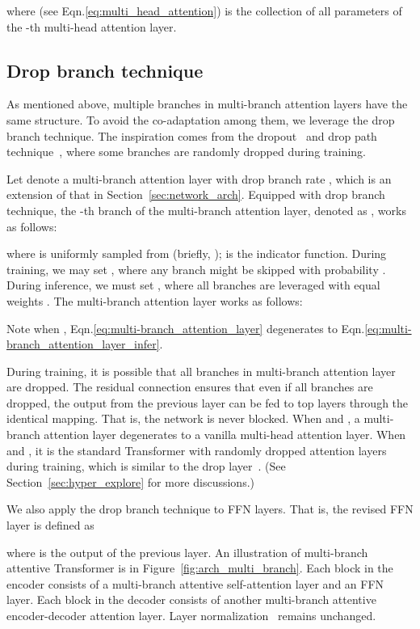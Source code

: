 \documentclass{article}
\begin{document}
where  (see Eqn.\eqref{eq:multi_head_attention}) is the collection of all parameters of the -th multi-head attention layer. 

\subsection{Drop branch technique}\label{sec:drop_branch}
As mentioned above, multiple branches in multi-branch attention layers have the same structure. To avoid the co-adaptation among them, we leverage the drop branch technique. The inspiration comes from the dropout~\cite{srivastava2014dropout} and drop path technique~\cite{larsson2017fractalnet}, where some branches are randomly dropped during training.

Let  denote a multi-branch attention layer with drop branch rate , which is an extension of that in Section~\ref{sec:network_arch}. Equipped with drop branch technique, the -th branch of the multi-branch attention layer, denoted as , works as follows:

where  is uniformly sampled from  (briefly, );  is the indicator function.
During training, we may set , where any branch might be skipped with probability . During inference, we must set , where all branches are leveraged with equal weights . The multi-branch attention layer  works as follows:

Note when , Eqn.\eqref{eq:multi-branch_attention_layer} degenerates to Eqn.\eqref{eq:multi-branch_attention_layer_infer}.

During training, it is possible that all branches in multi-branch attention layer are dropped. The residual connection ensures that even if all branches are dropped, the output from the previous layer can be fed to top layers through the identical mapping. That is, the network is never blocked. When  and , a multi-branch attention layer degenerates to a vanilla multi-head attention layer. When  and , it is the standard Transformer with randomly dropped attention layers during training, which is similar to the drop layer~\cite{fan2020reducing}. (See Section~\ref{sec:hyper_explore} for more discussions.)

We also apply the drop branch technique to FFN layers. That is, the revised FFN layer is defined as 

where  is the output of the previous layer. An illustration of multi-branch attentive Transformer is in Figure~\ref{fig:arch_multi_branch}. Each block in the encoder consists of a multi-branch attentive self-attention layer and an FFN layer. Each block in the decoder consists of another multi-branch attentive encoder-decoder attention layer. Layer normalization~\cite{ba2016layer} remains unchanged.
\end{document}
